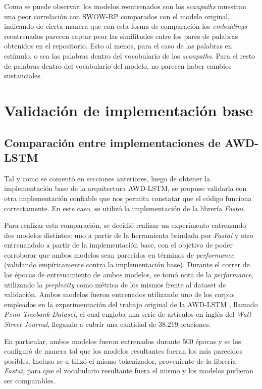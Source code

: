 Como se puede observar, los modelos reentrenados con los \textit{scanpaths} muestran una peor 
correlación con SWOW-RP comparados con el modelo original, indicando de cierta manera 
que con esta forma de comparación los \textit{embeddings} reentrenados parecen captar peor las 
similitudes entre los pares de palabras obtenidos en el repositorio. Esto al menos, para 
el caso de las palabras en estímulo, o sea las palabras dentro del vocabulario de los 
\textit{scanpaths}. Para el resto de palabras dentro del vocabulario del modelo, no parecen haber 
cambios sustanciales.

\section{Validación de implementación base}

\subsection{Comparación entre implementaciones de AWD-LSTM}

Tal y como se comentó en secciones anteriores, luego de obtener la implementación base 
de la arquitectura AWD-LSTM, se propuso validarla con otra implementación confiable que 
nos permita constatar que el código funciona correctamente. En este caso, se utilizó la 
implementación de la librería \textit{Fastai}.

Para realizar esta comparación, se decidió realizar un experimento entrenando dos 
modelos distintos: uno a partir de la herramienta brindada por \textit{Fastai} y otro 
entrenandolo a partir de la implementación base, con el objetivo de poder corroborar 
que ambos modelos sean parecidos en términos de \textit{performance} (validando empíricamente 
contra la implementación base). Durante el correr de las épocas de entrenamiento de ambos 
modelos, se tomó nota de la \textit{performance}, utilizando la \textit{perplexity} como métrica de los 
mismos frente al dataset de validación. Ambos modelos fueron entrenados utilizando 
uno de los corpus empleados en la experimentación del trabajo original de la AWD-LSTM 
\parencite{merity2017regularizingoptimizinglstmlanguage}, llamado \textit{Penn Treebank Dataset}, el cual engloba una serie de 
artículos en inglés del \textit{Wall Street Journal}, llegando a cubrir una 
cantidad de $38.219$ oraciones.

En particular, ambos modelos fueron entrenados durante $500$ épocas y se los configuró 
de manera tal que los modelos resultantes fueran los más parecidos posibles. Incluso se u
tilizó el mismo tokenizador, proveniente de la librería \textit{Fastai}, para que el vocabulario 
resultante fuera el mismo y los modelos pudieran ser comparables.

